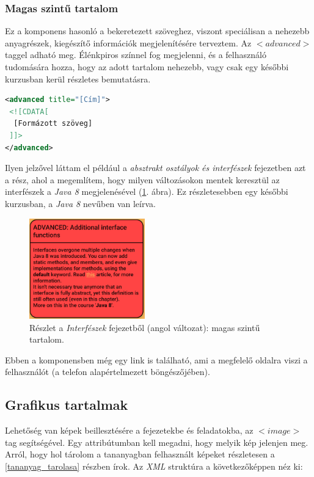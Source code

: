 \documentclass[12pt,a4paper]{article}
\newcommand{\xml}{\textit{XML}\xspace}
\begin{document}
	\subsubsection{Magas szintű tartalom}
	
	Ez a komponens hasonló a bekeretezett szöveghez, viszont speciálisan a nehezebb anyagrészek, kiegészítő információk megjelenítésére terveztem. Az $<advanced>$ taggel adható meg. Élénkpiros színnel fog megjelenni, és a felhasználó tudomására hozza, hogy az adott tartalom nehezebb, vagy csak egy későbbi kurzusban kerül részletes bemutatásra.
	
	\bigskip
	\begin{lstlisting}[language=XML]
<advanced title="[Cím]">
 <![CDATA[
  [Formázott szöveg]
 ]]>
</advanced>	
	\end{lstlisting}
	\bigskip
	
	Ilyen jelzővel láttam el például a \textit{absztrakt osztályok és interfészek} fejezetben azt a rész, ahol a megemlítem, hogy milyen változásokon mentek keresztül az interfészek a \textit{Java 8} megjelenésével (\ref{advanced_component_figure}. ábra). Ez részletesebben egy későbbi kurzusban, a \textit{Java 8} nevűben van leírva.
	
	\begin{figure}[h!]
		\centering
		\includegraphics[width=5cm]{advanced_component}
		\caption{Részlet a \textit{Interfészek} fejezetből (angol változat): magas szintű tartalom.}
		\label{advanced_component_figure}
	\end{figure}
	
	Ebben a komponensben még egy link is található, ami a megfelelő oldalra viszi a felhasználót (a telefon alapértelmezett böngészőjében).
	
	\subsection{Grafikus tartalmak}
	
	Lehetőség van képek beillesztésére a fejezetekbe és feladatokba, az $<image>$ tag segítségével. Egy attribútumban kell megadni, hogy melyik kép jelenjen meg. Arról, hogy hol tárolom a tananyagban felhasznált képeket részletesen a \ref{tananyag_tarolasa} részben írok. Az \xml struktúra a következőképpen néz ki:
	
\end{document}

